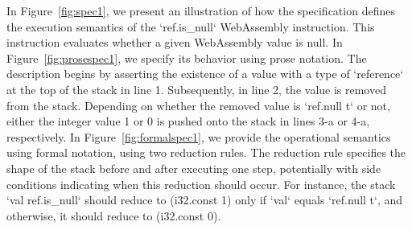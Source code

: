 In Figure~\ref{fig:spec1}, we present an illustration of how the specification
defines the execution semantics of the `ref.is\_null` WebAssembly instruction.
This instruction evaluates whether a given WebAssembly value is null. In
Figure~\ref{fig:prosespec1}, we specify its behavior using prose notation. The
description begins by asserting the existence of a value with a type of
`reference` at the top of the stack in line 1. Subsequently, in line 2, the
value is removed from the stack.  Depending on whether the removed value is
`ref.null t` or not, either the integer value 1 or 0 is pushed onto the stack
in lines 3-a or 4-a, respectively. In Figure~\ref{fig:formalspec1}, we provide
the operational semantics using formal notation, using two reduction rules. The reduction rule specifies
the shape of the stack before and after executing one step, potentially with
side conditions indicating when this reduction should occur. For instance, the
stack `val ref.is\_null` should reduce to (i32.const 1) only if `val` equals
`ref.null t`, and otherwise, it should reduce to (i32.const 0).


